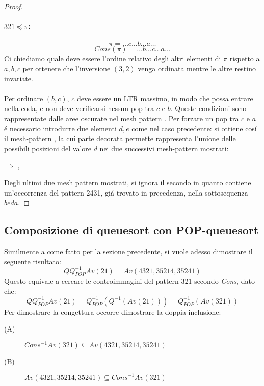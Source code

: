 \begin{proof}
\paragraph*{$321\preceq\pi$:}$$\pi=\dots c\dots b\dots a\dots$$$$Cons(\pi)=\dots b\dots c\dots a\dots$$
Ci chiediamo quale deve essere l'ordine relativo degli altri elementi di $\pi$ rispetto a $a,b,c$ per ottenere che l'inversione $(3,2)$ venga ordinata mentre le altre restino invariate.\\\\
Per ordinare $(b,c)$, $c$ deve essere un LTR massimo, in modo che possa entrare nella coda, e non deve verificarsi nessun pop tra $c$ e $b$. Queste condizioni sono rappresentate dalle aree oscurate nel mesh pattern . Per forzare un pop tra $c$ e $a$ \'e necessario introdurre due elementi $d,e$ come nel caso precedente: si ottiene cos\'i il mesh-pattern , la cui parte decorata permette rappresenta l'unione delle possibili posizioni del valore $d$ nei due successivi mesh-pattern mostrati:
\begin{center}
 $\Rightarrow$
,
\end{center}
Degli ultimi due mesh pattern mostrati, si ignora il secondo in quanto contiene un'occorrenza del pattern 2431, gi\'a trovato in precedenza, nella sottosequenza $beda$.
\end{proof}
\subsection*{Composizione di queuesort con POP-queuesort}
Similmente a come fatto per la sezione precedente, si vuole adesso dimostrare il seguente risultato:
$$QQ_{POP}^{-1}Av(21) = Av(4321, 35214, 35241)$$
Questo equivale a cercare le controimmagini del pattern 321 secondo \textit{Cons}, dato che:
$$QQ_{POP}^{-1}Av(21) = Q_{POP}^{-1}(Q^{-1}(Av(21))) = Q_{POP}^{-1}(Av(321))$$
Per dimostrare la congettura occorre dimostrare la doppia inclusione:
\begin{description}
\item[(A)]$Cons^{-1}Av(321) \subseteq Av(4321, 35214, 35241)$
\item[(B)]$Av(4321, 35214, 35241) \subseteq Cons^{-1}Av(321)$
\end{description}
